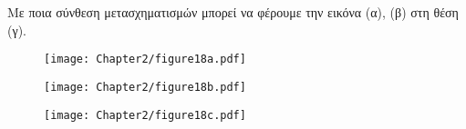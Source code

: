 \begin{exercise}
Με ποια σύνθεση μετασχηματισμών μπορεί να φέρουμε την εικόνα (α), (β) στη θέση (γ).

\begin{figure}[htb]
\begin{center}
	\begin{minipage}[b]{0.3\textwidth} 
	    \texttt{[image: Chapter2/figure18a.pdf]}
	\end{minipage}
\hfill
	\begin{minipage}[b]{0.3\textwidth} 
	    \texttt{[image: Chapter2/figure18b.pdf]}
	\end{minipage}
\hfill
	\begin{minipage}[b]{0.3\textwidth} 
	    \texttt{[image: Chapter2/figure18c.pdf]}
	\end{minipage}
\end{center}
\end{figure}

\end{exercise}

